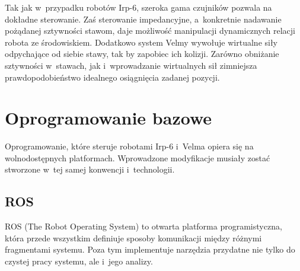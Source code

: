 	Tak jak w~przypadku robotów Irp-6, szeroka gama czujników pozwala na dokładne sterowanie. Zaś sterowanie impedancyjne, a~konkretnie nadawanie pożądanej sztywności stawom, daje możliwość manipulacji dynamicznych relacji robota ze środowiskiem. Dodatkowo system Velmy wywołuje wirtualne siły odpychające od siebie stawy, tak by zapobiec ich kolizji. Zarówno obniżanie sztywności w~stawach, jak i~wprowadzanie wirtualnych sił zimniejsza prawdopodobieństwo idealnego osiągnięcia zadanej pozycji.
	\section{Oprogramowanie bazowe}
	\label{s:oprogramowanie_bazowe}
	Oprogramowanie, które steruje robotami Irp-6 i~Velma opiera się na wolnodostępnych platformach. Wprowadzone modyfikacje musiały zostać stworzone w~tej samej konwencji i~technologii. 
		\subsection{ROS}
		\label{ss:ros}
		ROS (The Robot Operating System) to otwarta platforma programistyczna, która przede wszystkim definiuje sposoby komunikacji między różnymi fragmentami systemu\cite{ROS}. Poza tym implementuje narzędzia przydatne nie tylko do czystej pracy systemu, ale i~jego analizy.
		
